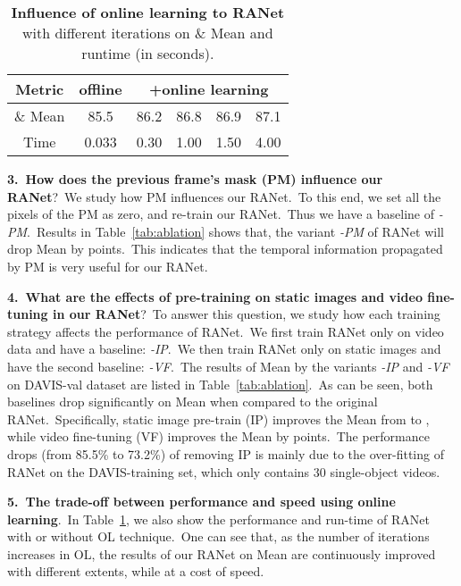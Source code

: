 \documentclass[10pt,twocolumn,letterpaper]{article}
\begin{document}
\begin{table}[t]
\vspace{1mm}
\centering
    \begin{tabular}{c||c|cccc}
    \Xhline{1pt}
\rowcolor[rgb]{ .873,  .91,  0.95}
    Metric & offline & \multicolumn{4}{c}{+online learning}
    \\
    \hline
    \hline
\& Mean & 85.5 & 86.2 & 86.8 & 86.9 & 87.1 \\
    Time & 0.033 & 0.30 & 1.00 & 1.50 & 4.00 
    \\
    \hline
    \end{tabular}\vspace{-3mm}
    \caption{\textbf{Influence of online learning to RANet} with different iterations on \& Mean and runtime (in seconds).} 
\label{tab:online}\vspace{-4mm}
\end{table}

\noindent
\textbf{3.\ How does the previous frame's mask (PM) influence our RANet}?\ 
We study how PM influences our RANet.\ To this end, we set all the pixels of the PM as zero, and re-train our RANet.\ Thus we have a baseline of \emph{-PM}.\ Results in Table~\ref{tab:ablation} shows that, the variant \emph{-PM} of RANet will drop  Mean by  points.\ This indicates that the temporal information propagated by PM is very useful for our RANet.





\noindent
\textbf{4.\ What are the effects of pre-training on static images and video fine-tuning in our RANet}?\
To answer this question, we study how each training strategy affects the performance of RANet.\ We first train RANet only on video data and have a baseline: \emph{-IP}.\ We then train RANet only on static images and have the second baseline: \emph{-VF}.\ The results of  Mean by the variants \emph{-IP} and \emph{-VF} on DAVIS-val dataset are listed in Table~\ref{tab:ablation}.\ As can be seen, both baselines drop significantly on  Mean when compared to the original RANet.\ Specifically, static image pre-train (IP) improves the  Mean from  to , while video fine-tuning (VF) improves the  Mean by  points.\ The performance drops (from 85.5\% to 73.2\%) of removing IP is mainly due to the over-fitting of RANet on the DAVIS-training set, which only contains 30 single-object videos.



\noindent
\textbf{5.\ The trade-off between performance and speed using online learning}.\
In Table~\ref{tab:online}, we also show the performance and run-time of RANet with or without OL technique.\ One can see that, as the number of iterations increases in OL, the results of our RANet on  Mean are continuously improved with different extents, while at a cost of speed.
\end{document}
